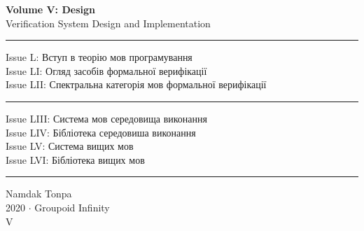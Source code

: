 \documentclass{book}
\begin{document}
\begin{titlepage}
    \centering
    \vspace*{0.5in}
    \Huge
    \textbf{Volume V: Design} \\
    \LARGE
    Verification System Design and Implementation \\
    \vspace{1.5in}
    \small
    \flushleft
    \vspace{-2mm} \rule{\textwidth}{0.4pt}
    Issue L: Вступ в теорію мов програмування \\
    Issue LI: Огляд засобів формальної верифікації \\
    Issue LII: Спектральна категорія мов формальної верифікації \\
    \vspace{-2mm} \rule{\textwidth}{0.4pt}
    Issue LIII: Система мов середовища виконання \\
    Issue LIV: Бібліотека середовиша виконання \\
    Issue LV: Система вищих мов \\
    Issue LVI: Бібліотека вищих мов \\
    \vspace{-2mm} \rule{\textwidth}{0.4pt}
    \centering
    \vfill
    \large
    Namdak Tonpa \\
    \Large
    2020 $\cdot$ Groupoid Infinity \\
    V
\end{titlepage}

\tableofcontents
\newif\ifincludeTOC










\end{document}
